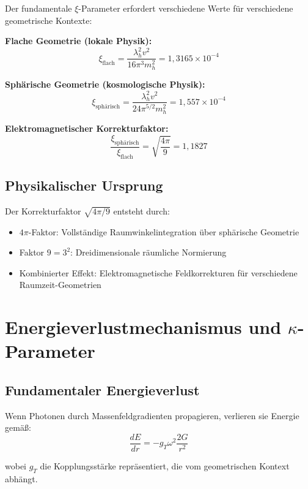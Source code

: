 \documentclass[12pt,a4paper]{article}
\begin{document}
	Der fundamentale $\xi$-Parameter erfordert verschiedene Werte für verschiedene geometrische Kontexte:
	
	\textbf{Flache Geometrie (lokale Physik):}
	\begin{equation}
		\xi_{\text{flach}} = \frac{\lambda_h^2 v^2}{16\pi^3 m_h^2} = 1{,}3165 \times 10^{-4}
	\end{equation}
	
	\textbf{Sphärische Geometrie (kosmologische Physik):}
	\begin{equation}
		\xi_{\text{sphärisch}} = \frac{\lambda_h^2 v^2}{24\pi^{5/2} m_h^2} = 1{,}557 \times 10^{-4}
	\end{equation}
	
	\textbf{Elektromagnetischer Korrekturfaktor:}
	\begin{equation}
		\frac{\xi_{\text{sphärisch}}}{\xi_{\text{flach}}} = \sqrt{\frac{4\pi}{9}} = 1{,}1827
	\end{equation}
	
	\subsection{Physikalischer Ursprung}
	Der Korrekturfaktor $\sqrt{4\pi/9}$ entsteht durch:
	\begin{itemize}
		\item $4\pi$-Faktor: Vollständige Raumwinkelintegration über sphärische Geometrie
		\item Faktor $9 = 3^2$: Dreidimensionale räumliche Normierung
		\item Kombinierter Effekt: Elektromagnetische Feldkorrekturen für verschiedene Raumzeit-Geometrien
	\end{itemize}
	
	\section{Energieverlustmechanismus und $\kappa$-Parameter}
	
	\subsection{Fundamentaler Energieverlust}
	Wenn Photonen durch Massenfeldgradienten propagieren, verlieren sie Energie gemäß:
	\begin{equation}
		\frac{dE}{dr} = -g_T \omega^2 \frac{2G}{r^2}
	\end{equation}
	
	wobei $g_T$ die Kopplungsstärke repräsentiert, die vom geometrischen Kontext abhängt.
	
\end{document}
